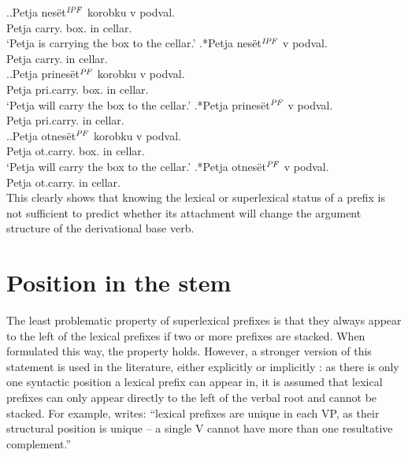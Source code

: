 \ex.\label{ex:nesti}\ag.Petja nes\"{e}t$^{\mathit{IPF}}$ korobku v podval.\\
Petja carry. box. in cellar.\\
\vspace{0.5em}
`Petja is carrying the box to the cellar.'
\bg.*Petja nes\"{e}t$^{\mathit{IPF}}$ v podval.\\
Petja carry. in cellar.\\

\ex.\label{ex:prinesti}\ag.Petja prines\"{e}t$^{\mathit{PF}}$ korobku v podval.\\
Petja pri.carry. box. in cellar.\\
\vspace{0.5em}
`Petja will carry the box to the cellar.'
\bg.*Petja prines\"{e}t$^{\mathit{PF}}$ v podval.\\
Petja pri.carry. in cellar.\\

\ex.\label{ex:otnesti}\ag.Petja otnes\"{e}t$^{\mathit{PF}}$ korobku v podval.\\
Petja ot.carry. box. in cellar.\\
\vspace{0.5em}
`Petja will carry the box to the cellar.'
\bg.*Petja otnes\"{e}t$^{\mathit{PF}}$ v podval.\\
Petja ot.carry. in cellar.\\

This clearly shows that knowing the lexical or superlexical status of a prefix is not sufficient to predict whether its attachment will change the argument structure of the derivational base verb.
\section{Position in the stem}\label{section:new:position}
The least problematic property of superlexical prefixes is that they always appear to the left of the lexical prefixes if two or more prefixes are stacked. When formulated this way, the property holds. However, a stronger version of this statement is used in the literature, either explicitly \citep{Svenonius:04b} or implicitly \citep{Tatevosov:09}: as there is only one syntactic position a lexical prefix can appear in, it is assumed that lexical prefixes can only appear directly to the left of the verbal root and cannot be stacked. For example, \citet[206]{Svenonius:04b} writes: ``lexical prefixes are unique in each VP, as their structural position is unique -- a single V cannot have more than one resultative complement.''


